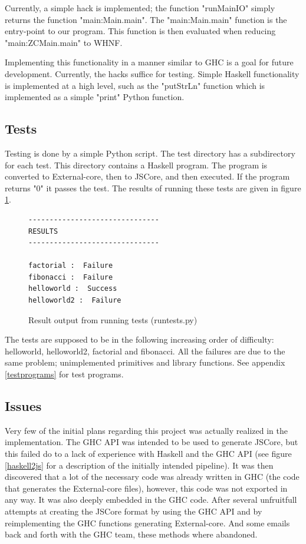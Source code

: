 Currently, a simple hack is implemented; the function "runMainIO" simply returns 
the function "main:Main.main".
The "main:Main.main" function is the entry-point to our program. This function 
is then evaluated when reducing "main:ZCMain.main" to WHNF.

Implementing this functionality in a manner similar to GHC is a goal for future
development. Currently, the hacks suffice for testing.
Simple Haskell functionality is implemented at a high level, such as the
"putStrLn" function which is implemented as a simple "print" Python function.

\subsection{Tests}

Testing is done by a simple Python script. The test directory has a subdirectory 
for each test. This directory
contains a Haskell program. The program is converted to External-core, then 
to JSCore, and then executed.
If the program returns "0" it passes the test. The results of running these 
tests are given in figure \ref{tests}.


\begin{figure}[H]
\begin{center}
\begin{minipage}{0.45\textwidth}
\begin{lstlisting}
-------------------------------
RESULTS
-------------------------------

factorial :  Failure
fibonacci :  Failure
helloworld :  Success
helloworld2 :  Failure
\end{lstlisting}
\end{minipage}
\end{center}
\caption[Result output from running tests]{Result output from running tests (runtests.py)}
\label{tests}
\end{figure}

The tests are supposed to be in the following increasing order of difficulty: 
helloworld, helloworld2, factorial and fibonacci. 
All the failures are due to the same problem; unimplemented 
primitives and library functions. See appendix \ref{testprograms} for test programs.

\subsection{Issues}


Very few of the initial plans regarding this project was actually realized in 
the implementation. The GHC API was intended to be used to generate JSCore, 
but this failed do to a lack of experience with Haskell and the GHC API 
(see figure \ref{haskell2js} for a description of the initially intended
pipeline). It was then discovered that a lot of the necessary code was already
written in GHC (the code that generates the External-core files), however, 
this code was not exported in any way. It was also deeply embedded in the GHC 
code. After several unfruitfull attempts at creating the JSCore format by using the GHC API
and by reimplementing the GHC functions generating External-core. And some emails back 
and forth with the GHC team, these methods where abandoned.

